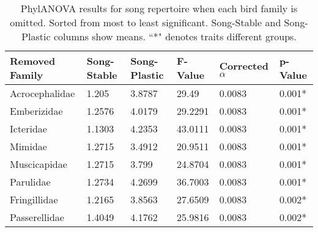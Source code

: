 \documentclass[a4paper,12pt]{article}
\begin{document}
\begin{table}[ht]
\caption{PhylANOVA results for song repertoire when each bird family is omitted.  Sorted from most to least significant.  Song-Stable and Song-Plastic columns show means.  ``*" denotes traits different groups.}
\centering
\begin{tabular}{llllll}
  \hline
Removed Family & Song-Stable & Song-Plastic & F-Value & Corrected $\alpha$ & p-Value \\ 
  \hline
Acrocephalidae & 1.205 & 3.8787 & 29.49 & 0.0083 & 0.001* \\ 
  Emberizidae & 1.2576 & 4.0179 & 29.2291 & 0.0083 & 0.001* \\ 
  Icteridae & 1.1303 & 4.2353 & 43.0111 & 0.0083 & 0.001* \\ 
  Mimidae & 1.2715 & 3.4912 & 20.9511 & 0.0083 & 0.001* \\ 
  Muscicapidae & 1.2715 & 3.799 & 24.8704 & 0.0083 & 0.001* \\ 
  Parulidae & 1.2734 & 4.2699 & 36.7003 & 0.0083 & 0.001* \\ 
  Fringillidae & 1.2165 & 3.8563 & 27.6509 & 0.0083 & 0.002* \\ 
  Passerellidae & 1.4049 & 4.1762 & 25.9816 & 0.0083 & 0.002* \\ 
   \hline
\end{tabular}
\end{table}
\end{document}
